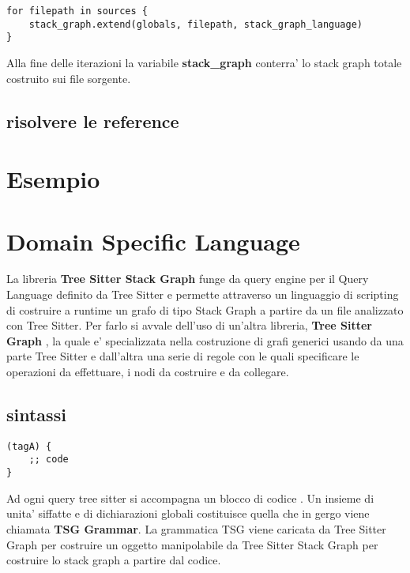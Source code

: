 \begin{lstlisting}
for filepath in sources {
    stack_graph.extend(globals, filepath, stack_graph_language)
}
\end{lstlisting}

Alla fine delle iterazioni la variabile \textbf{stack\_graph} conterra' lo stack graph totale costruito sui file sorgente.

\subsection{risolvere le reference}

\section{Esempio}

\section{Domain Specific Language}

La libreria \textbf{Tree Sitter Stack Graph} \cite{TreeSitterStackGraph} funge da query engine per il Query Language definito da Tree Sitter e permette attraverso un linguaggio di scripting di costruire a runtime un grafo di tipo Stack Graph a partire da un file analizzato con Tree Sitter.
Per farlo si avvale dell'uso di un'altra libreria, \textbf{Tree Sitter Graph} \cite{TreeSitterGraph}, la quale e' specializzata nella costruzione di grafi generici usando da una parte Tree Sitter e dall'altra una serie di regole con le quali specificare le operazioni da effettuare, i nodi da costruire e da collegare.

\subsection{sintassi}

\begin{lstlisting}
(tagA) {
    ;; code
}
\end{lstlisting}

Ad ogni query tree sitter si accompagna un blocco di codice \cite{TreeSitterGraphReferenceHighLevelStructure}.
Un insieme di unita' siffatte e di dichiarazioni globali costituisce quella che in gergo viene chiamata \textbf{TSG Grammar}.
La grammatica TSG viene caricata da Tree Sitter Graph per costruire un oggetto manipolabile da Tree Sitter Stack Graph per costruire lo stack graph a partire dal codice.

